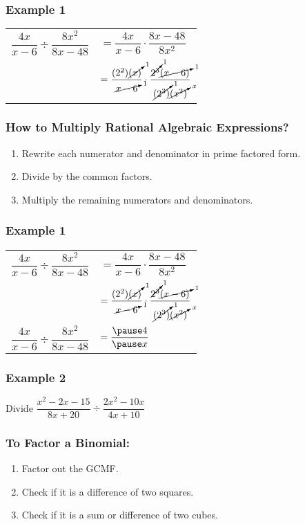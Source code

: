\documentclass[14pt]{beamer}
\begin{document}
    \begin{frame}
    	\frametitle{Example 1}
    	\begin{tabular}{ll}
    		$\dfrac{4x}{x - 6} \div \dfrac{8x^2}{8x - 48} $ & $= \dfrac{4x}{x - 6} \cdot \dfrac{8x - 48}{8x^2} $ \\[1em]
    		
    		& $= \dfrac{(2^2) \cancelto{1}{(x)}}{\cancelto{1}{x  - 6}} \cdot \dfrac{ \cancelto{1}{2^3}  \cancelto{1}{(x  - 6)}}{ \cancelto{1}{(2^3)}  \cancelto{x}{(x^2)}} $ \\
    	\end{tabular}
    \end{frame}

    \begin{frame}
    	\frametitle{How to Multiply Rational Algebraic Expressions?}
    	\begin{enumerate}
    		\item Rewrite each numerator and denominator in prime factored form.
    		\item Divide by the common factors.
    		\item Multiply the remaining numerators and denominators.
    	\end{enumerate}
    \end{frame}

    \begin{frame}
    	\frametitle{Example 1}
    	\begin{tabular}{ll}
    		$\dfrac{4x}{x - 6} \div \dfrac{8x^2}{8x - 48} $ & $= \dfrac{4x}{x - 6} \cdot \dfrac{8x - 48}{8x^2} $ \\[1em]
    		
    		& $= \dfrac{(2^2) \cancelto{1}{(x)}}{\cancelto{1}{x  - 6}} \cdot \dfrac{ \cancelto{1}{2^3}  \cancelto{1}{(x  - 6)}}{ \cancelto{1}{(2^3)}  \cancelto{x}{(x^2)}} $ \\[1em]
    		
    		\pause $\dfrac{4x}{x - 6} \div \dfrac{8x^2}{8x - 48} $ & $= \dfrac{\pause 4}{\pause x} $ \\
    	\end{tabular}
    \end{frame}

    \begin{frame}
    	\frametitle{Example 2}
    	Divide $\dfrac{x^2 - 2x - 15}{8x + 20} \div \dfrac{2x^2 - 10x}{4x + 10}$ 
    \end{frame}

    \begin{frame}
    	\frametitle{To Factor a Binomial:}
    	\begin{enumerate}
    		\item<1-> Factor out the GCMF.
    		\item<2-> Check if it is a difference of two squares.
    		\item<3-> Check if it is a sum or difference of two cubes.
    	\end{enumerate}
    \end{frame}
\end{document}
